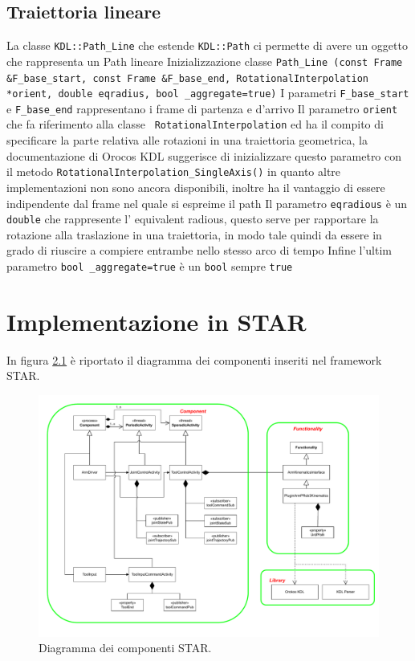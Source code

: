 \section{Traiettoria lineare}
La classe \texttt{KDL::Path_Line} che estende \texttt{KDL::Path} ci permette di avere un oggetto che rappresenta un Path lineare
Inizializzazione classe \texttt{Path_Line (const Frame &F_base_start, const Frame &F_base_end, RotationalInterpolation *orient, double eqradius, bool _aggregate=true)}
I parametri \texttt{F_base_start} e \texttt{F_base_end} rappresentano i frame di partenza e d'arrivo 
Il parametro \texttt{orient} che fa riferimento alla classe \texttt{ RotationalInterpolation} ed ha il compito di specificare la parte relativa alle rotazioni in una traiettoria geometrica, la documentazione di Orocos KDL suggerisce di inizializzare questo parametro con il metodo \texttt{RotationalInterpolation_SingleAxis()} in quanto altre implementazioni non sono ancora disponibili, inoltre ha il vantaggio di essere indipendente dal frame nel quale si espreime il path
Il parametro \texttt{eqradious} è un \texttt{double} che rappresente l' equivalent radious, questo serve per rapportare la rotazione alla traslazione in una traiettoria, in modo tale quindi da essere in grado di riuscire a compiere entrambe nello stesso arco di tempo
Infine l'ultim parametro \texttt{bool _aggregate=true} è un \texttt{bool} sempre \texttt{true}

\chapter{Implementazione in STAR}

In figura \ref{fig:star_diagram} è riportato il diagramma dei componenti inseriti nel framework STAR. 
\begin{figure}[tbh]
	\centering
	\includegraphics[width=1\linewidth]{./ImageFiles/publish_subscribe_architecture.drawio.pdf}
	\caption{Diagramma dei componenti STAR.}
	\label{fig:star_diagram}
\end{figure}

